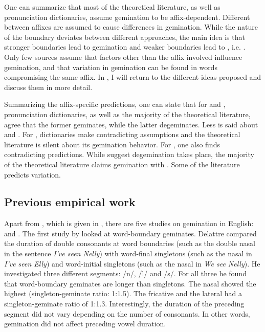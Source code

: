  
One can summarize that most of the theoretical literature, as well as pronunciation dictionaries, assume gemination to be affix-dependent. Different  between affixes are assumed to cause differences in gemination. While the nature of the boundary deviates between different approaches, the main idea is that stronger boundaries lead to gemination and weaker boundaries lead to , i.e. . Only few sources assume that factors other than the affix involved influence gemination, and that variation in gemination can be found in words compromising the same affix.  In , I will return to the different ideas proposed and discuss them in more detail. 

Summarizing the affix-specific predictions, one can state that for  and , pronunciation dictionaries, as well as the majority of the theoretical literature, agree that the former geminates, while the latter {degeminates}. Less is said about  and . For , dictionaries make contradicting assumptions and the theoretical literature is silent about its gemination behavior. For , one also finds contradicting predictions. While \cite{Wells.2008} suggest {degemination} takes place, the majority of the theoretical literature claims gemination with . Some of the literature predicts variation. 

\subsection{Previous empirical work}\label{previous empirical work}

Apart from \cite{BenHedia.2017}, which is given in , there are five studies on gemination in English: \cite{Delattre.,Kaye.2005,Oh.2012,Oh.2013}   and \cite{Kotzor.2016}.   %
The first study by \cite{Delattre.} looked at word-boundary geminates. Delattre compared the duration of double consonants at word boundaries (such as the double nasal  in the sentence \textit{I've seen Nelly}) with word-final singletons (such as the nasal in \textit{I've seen Elly}) and word-initial singletons (such as the nasal in \textit{We see Nelly}). He investigated three different segments: /n/, /l/ and /s/. For all three he found that word-boundary geminates are longer than singletons. The nasal showed the highest  (singleton-geminate ratio: 1:1.5). The fricative and the lateral had a singleton-geminate ratio of 1:1.3. Interestingly, the duration of the preceding segment did not vary depending on the number of consonants. In other words, gemination did not affect preceding vowel duration.

